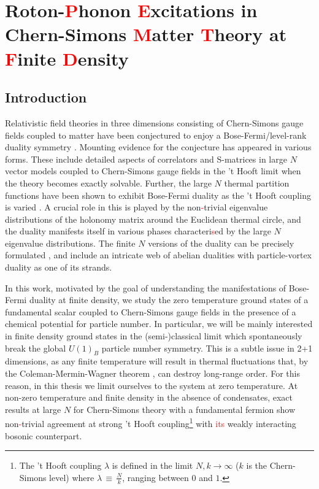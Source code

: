 \chapter{Roton-\textcolor{red}{P}honon \textcolor{red}{E}xcitations in Chern-Simons \textcolor{red}{M}atter \textcolor{red}{T}heory at \textcolor{red}{F}inite \textcolor{red}{D}ensity}
\label{ch:Chapter_3}
    \graphicspath{{Chapter_3_Folder/figures/PNG/}{Chapter_3_Folder/figures/PDF/}{Chapter_3_Folder/figures/}}

\section{Introduction}
Relativistic field theories in three dimensions consisting of Chern-Simons gauge fields coupled to matter have been conjectured to enjoy a Bose-Fermi/level-rank duality symmetry \cite{Giombi:2011kc}. Mounting evidence for the conjecture has appeared in various forms. These include detailed aspects of  correlators \cite{Giombi:2011kc, Aharony:2011jz, Maldacena:2011jn, Maldacena:2012sf, Aharony:2012nh} and S-matrices \cite{Jain:2014nza, Dandekar:2014era} in large $N$ vector models coupled to Chern-Simons gauge fields in the 't Hooft limit when the theory  becomes exactly solvable. 
Further, the large $N$ thermal partition functions have been shown to exhibit Bose-Fermi duality as the 't Hooft coupling is varied \cite{Giombi:2011kc, Aharony:2012ns,Jain:2013py, Jain:2013gza, Takimi:2013zca}.  A crucial role in this is played by the non\textcolor{red}{-}trivial eigenvalue distributions of the holonomy matrix around the Euclidean thermal circle, and the duality manifests itself in various phases characteri\textcolor{red}{s}ed by the large $N$ eigenvalue distributions. The  finite $N$ versions of the duality can be precisely formulated \cite{Aharony:2015mjs}, and include an intricate web of abelian dualities \cite{Seiberg:2016gmd, Karch:2016sxi, Murugan:2016zal} with particle-vortex duality as one of its strands.

 In this work, motivated by the goal of understanding the manifestations of Bose-Fermi duality at finite density, we  study the zero temperature ground states of a fundamental scalar coupled to Chern-Simons gauge fields in the presence of a chemical potential for particle number. In particular, we will be mainly interested in finite density ground states in the (semi-)classical limit which spontaneously break the global $U(1)_B$ particle number symmetry. This is a subtle issue in 2+1 dimensions, as any finite temperature will result in thermal fluctuations that, by the Coleman-Mermin-Wagner theorem \cite{Coleman:1973ci, Mermin:1966fe}, can  destroy long-range order. 
 For this reason, in this thesis we limit ourselves to the system at zero temperature. 
 At  non-zero temperature and finite density in the absence of condensates,  exact results at large $N$ for Chern-Simons theory with a fundamental fermion \cite{Geracie:2015drf, Gur-Ari:2016xff} show non\textcolor{red}{-}trivial agreement at strong 't Hooft coupling\footnote{The 't Hooft coupling $\lambda$ is defined in the limit $N,k\to\infty$  ($k$ is the Chern-Simons level) where $\lambda \,\equiv\,\frac{N}{k}$, ranging between $0$ and $1$. } with \textcolor{red}{its} weakly interacting bosonic counterpart.
 
